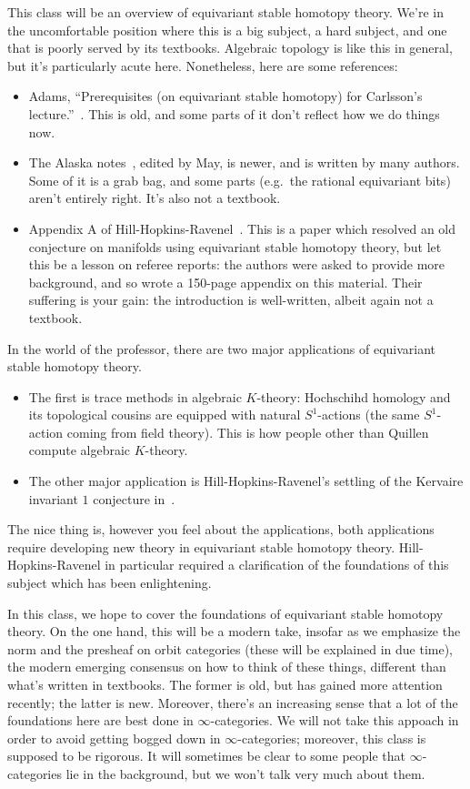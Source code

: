 
This class will be an overview of equivariant stable homotopy theory. We're in the uncomfortable position where
this is a big subject, a hard subject, and one that is poorly served by its textbooks. Algebraic topology is like
this in general, but it's particularly acute here. Nonetheless, here are some references:
\begin{itemize}
	\item Adams, ``Prerequisites (on equivariant stable homotopy) for Carlsson's lecture.''~\cite{Adams84}. This is
	old, and some parts of it don't reflect how we do things now.
	\item The Alaska notes~\cite{AlaskaNotes}, edited by May, is newer, and is written by many authors. Some of it
	is a grab bag, and some parts (e.g.\ the rational equivariant bits) aren't entirely right. It's also not a
	textbook.
	\item Appendix A of Hill-Hopkins-Ravenel~\cite{HHR}. This is a paper which resolved an old conjecture on
	manifolds using equivariant stable homotopy theory, but let this be a lesson on referee reports: the authors
	were asked to provide more background, and so wrote a 150-page appendix on this material. Their suffering is
	your gain: the introduction is well-written, albeit again not a textbook.
\end{itemize}
In the world of the professor, there are two major applications of equivariant stable homotopy theory.
\begin{itemize}
	\item The first is trace methods in algebraic $K$-theory: Hochschihd homology and its topological cousins are
	equipped with natural $S^1$-actions (the same $S^1$-action coming from field theory). This is how people
	other than Quillen compute algebraic $K$-theory.
	\item The other major application is Hill-Hopkins-Ravenel's settling of the Kervaire invariant $1$ conjecture
	in~\cite{HHR}.
\end{itemize}
The nice thing is, however you feel about the applications, both applications require developing new theory in
equivariant stable homotopy theory. Hill-Hopkins-Ravenel in particular required a clarification of the foundations
of this subject which has been enlightening.

In this class, we hope to cover the foundations of equivariant stable homotopy theory. On the one hand, this will
be a modern take, insofar as we emphasize the norm and the presheaf on orbit categories (these will be explained in
due time), the modern emerging consensus on how to think of these things, different than what's written in
textbooks. The former is old, but has gained more attention recently; the latter is new. Moreover, there's an
increasing sense that a lot of the foundations here are best done in $\infty$-categories. We will not take this
appoach in order to avoid getting bogged down in $\infty$-categories; moreover, this class is supposed to be
rigorous. It will sometimes be clear to some people that $\infty$-categories lie in the background, but we won't
talk very much about them.

